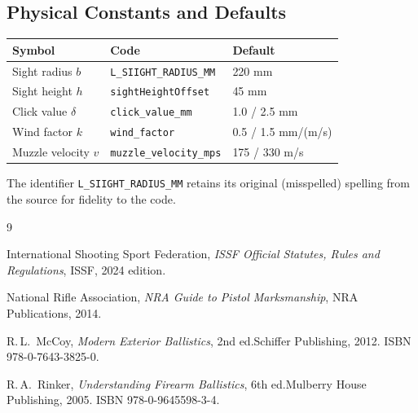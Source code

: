 \documentclass[11pt]{article}
\newcommand{\code}[1]{\texttt{#1}}
\begin{document}
\subsection{Physical Constants and Defaults}

\begin{center}
\begin{tabular}{lll}
\toprule
\textbf{Symbol} & \textbf{Code} & \textbf{Default}\\
\midrule
Sight radius $b$ & \code{L\_SIIGHT\_RADIUS\_MM} & 220 mm\\
Sight height $h$ & \code{sightHeightOffset} & 45 mm\\
Click value $\delta$ & \code{click\_value\_mm} & 1.0 / 2.5 mm\\
Wind factor $k$ & \code{wind\_factor} & 0.5 / 1.5 mm/(m/s)\\
Muzzle velocity $v$ & \code{muzzle\_velocity\_mps} & 175 / 330 m/s\\
\bottomrule
\end{tabular}
\end{center}

\noindent The identifier \code{L\_SIIGHT\_RADIUS\_MM} retains its original
(misspelled) spelling from the source for fidelity to the code.

\begin{thebibliography}{9}

  International Shooting Sport Federation,
  \textit{ISSF Official Statutes, Rules and Regulations},
  ISSF, 2024 edition.

  National Rifle Association,
  \textit{NRA Guide to Pistol Marksmanship},
  NRA Publications, 2014.

  R.\,L.~McCoy,
  \textit{Modern Exterior Ballistics},
  2nd ed.\@ Schiffer Publishing, 2012.
  ISBN 978-0-7643-3825-0.

  R.\,A.~Rinker,
  \textit{Understanding Firearm Ballistics},
  6th ed.\@ Mulberry House Publishing, 2005.
  ISBN 978-0-9645598-3-4.

\end{thebibliography}
\end{document}
